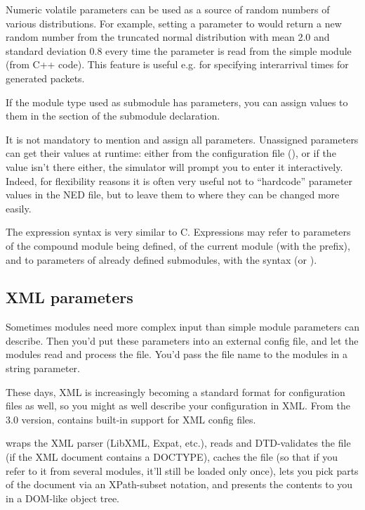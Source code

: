 Numeric volatile parameters can be used as a source of random numbers
of various distributions. For example, setting a parameter to
 would return a new random number
from the truncated normal distribution with mean 2.0 and standard deviation 0.8
every time the parameter is read from the simple module (from C++ code).
This feature is useful e.g. for specifying interarrival times for generated
packets.

If the module type used as submodule has parameters, you can assign
values to them in the  section of the submodule
declaration.

It is not mandatory to mention and assign all parameters.
Unassigned parameters can get their values at runtime: either from
the configuration file (), or if the value
isn't there either, the simulator will prompt you to enter it
interactively. Indeed, for flexibility reasons it is often very useful
not to ``hardcode'' parameter values in the NED file,
but to leave them to  where they can be
changed more easily.

The expression syntax  is very similar to C.
Expressions may refer to parameters of the compound module being defined,
of the current module (with the  prefix), and to parameters
of already defined submodules, with the syntax 
(or ).


\subsection{XML parameters}

Sometimes modules need more complex input than simple module parameters
can describe. Then you'd put these parameters into an external config file,
and let the modules read and process the file. You'd pass the file name
to the modules in a string parameter.

These days, XML is increasingly becoming a standard format for configuration
files as well, so you might as well describe your configuration in XML.
From the 3.0 version, {\opp} contains built-in support for XML config files.

{\opp} wraps the XML parser (LibXML, Expat, etc.), reads and DTD-validates
the file (if the XML document contains a DOCTYPE), caches the file
(so that if you refer to it from several modules, it'll still be loaded
only once), lets you pick parts of the document via an XPath-subset notation,
and presents the contents to you in a DOM-like object tree.

